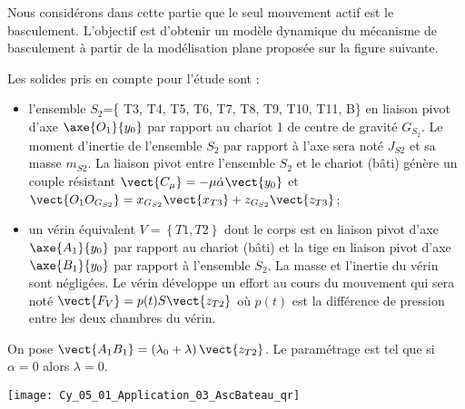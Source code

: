 Nous considérons dans cette partie que le seul mouvement actif est le basculement.
L’objectif est d’obtenir un modèle dynamique du mécanisme de basculement à partir de la modélisation plane proposée sur la figure suivante.


Les solides pris en compte pour l’étude sont :
\begin{itemize}
\item l'ensemble $S_2$=\{ T3, T4, T5, T6, T7, T8, T9, T10, T11, B\} en liaison pivot d'axe $\axe{O_1}{y_0}$ par rapport au chariot 1 de centre de gravité $G_{S_2}$. Le moment d’inertie de l’ensemble $S_2$ par rapport à l’axe sera noté $J_{S2}$ et sa masse $m_{S2}$. La liaison pivot entre l’ensemble $S_2$ et le chariot (bâti) génère un couple résistant $\vect{C_{\mu}}=-\mu\dot{\alpha}\vect{y_0}$ et $\vect{O_1O_{G_{S2}}}=x_{G_{S2}} \vect{x_{T3}}+z_{G_{S2}} \vect{z_{T3}}$; 
\item un vérin équivalent $V=\left\{ T1,T2\right\}$ dont le corps est en liaison pivot d’axe $\axe{A_1}{y_0}$ par rapport au chariot (bâti) et la tige en liaison pivot d’axe $\axe{B_1}{y_0}$ par rapport à l’ensemble $S_2$. La masse et l’inertie du vérin sont négligées. Le vérin développe un effort au cours du mouvement qui sera noté $\vect{F_V} = p(t) S \vect{z_{T2}}$ où $p(t)$ est la différence de pression entre les deux chambres du vérin.
\end{itemize}


On pose $\vect{A_1B_1} = \left( \lambda_0+\lambda\right)\vect{z_{T2}}$. Le paramétrage est tel que si $\alpha=0$ alors $\lambda=0$.
\fi

%
%

\ifprof
\else
\begin{marginfigure}
\centering
\texttt{[image: Cy\_05\_01\_Application\_03\_AscBateau\_qr]}
\end{marginfigure}
\fi




